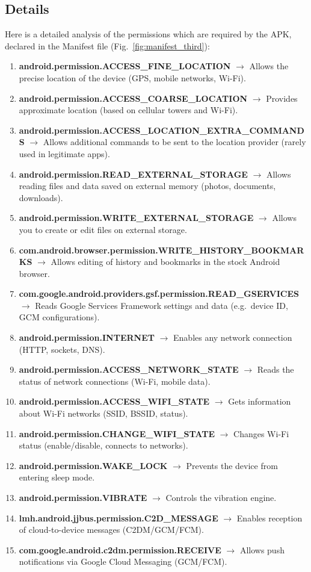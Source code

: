 \subsection{Details}
Here is a detailed analysis of the permissions which are required by the APK, declared in the Manifest file (Fig.\ \ref{fig:manifest_third}):
\begin{enumerate}
\item \textbf{android.permission.ACCESS\_FINE\_LOCATION} $\rightarrow$ Allows the precise location of the device (GPS, mobile networks, Wi-Fi).
\item \textbf{android.permission.ACCESS\_COARSE\_LOCATION} $\rightarrow$ Provides approximate location (based on cellular towers and Wi-Fi).
\item \textbf{android.permission.ACCESS\_LOCATION\_EXTRA\_COMMANDS} $\rightarrow$ Allows additional commands to be sent to the location provider (rarely used in legitimate apps).
\item \textbf{android.permission.READ\_EXTERNAL\_STORAGE} $\rightarrow$ Allows reading files and data saved on external memory (photos, documents, downloads).
\item \textbf{android.permission.WRITE\_EXTERNAL\_STORAGE} $\rightarrow$ Allows you to create or edit files on external storage.
\item \textbf{com.android.browser.permission.WRITE\_HISTORY\_BOOKMARKS} $\rightarrow$ Allows editing of history and bookmarks in the stock Android browser.
\item \textbf{com.google.android.providers.gsf.permission.READ\_GSERVICES} $\rightarrow$ Reads Google Services Framework settings and data (e.g.\ device ID, GCM configurations).
\item \textbf{android.permission.INTERNET} $\rightarrow$ Enables any network connection (HTTP, sockets, DNS).
\item \textbf{android.permission.ACCESS\_NETWORK\_STATE} $\rightarrow$ Reads the status of network connections (Wi-Fi, mobile data).
\item \textbf{android.permission.ACCESS\_WIFI\_STATE} $\rightarrow$ Gets information about Wi-Fi networks (SSID, BSSID, status).
\item \textbf{android.permission.CHANGE\_WIFI\_STATE} $\rightarrow$ Changes Wi-Fi status (enable/disable, connects to networks).
\item \textbf{android.permission.WAKE\_LOCK} $\rightarrow$ Prevents the device from entering sleep mode.
\item \textbf{android.permission.VIBRATE} $\rightarrow$ Controls the vibration engine.
\item \textbf{lmh.android.jjbus.permission.C2D\_MESSAGE} $\rightarrow$ Enables reception of cloud-to-device messages (C2DM/GCM/FCM).
\item \textbf{com.google.android.c2dm.permission.RECEIVE} $\rightarrow$ Allows push notifications via Google Cloud Messaging (GCM/FCM).
\end{enumerate}

